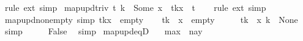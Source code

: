 \begin{isabellebody}
\ {\isacharparenleft}{\kern0pt}rule\ ext{\isacharparenright}{\kern0pt}\ simp%
\endisatagproof
{\isafoldproof}%
%
\isadelimproof
%
\endisadelimproof
%
\isadelimdocument
%
\endisadelimdocument
%
\isatagdocument
%
\isamarkuptrue%
%
\endisatagdocument
{\isafolddocument}%
%
\isadelimdocument
%
\endisadelimdocument
{}\isamarkupfalse%
\ map{\isacharunderscore}{\kern0pt}upd{\isacharunderscore}{\kern0pt}triv{\isacharcolon}{\kern0pt}\ {\isachardoublequoteopen}t\ k\ {\isacharequal}{\kern0pt}\ Some\ x\ {\isasymLongrightarrow}\ t{\isacharparenleft}{\kern0pt}k{\isasymmapsto}x{\isacharparenright}{\kern0pt}\ {\isacharequal}{\kern0pt}\ t{\isachardoublequoteclose}\isanewline
%
\isadelimproof
\ \ %
\endisadelimproof
%
\isatagproof
{}\isamarkupfalse%
\ {\isacharparenleft}{\kern0pt}rule\ ext{\isacharparenright}{\kern0pt}\ simp%
\endisatagproof
{\isafoldproof}%
%
\isadelimproof
\isanewline
%
\endisadelimproof
\isanewline
{}\isamarkupfalse%
\ map{\isacharunderscore}{\kern0pt}upd{\isacharunderscore}{\kern0pt}nonempty\ {\isacharbrackleft}{\kern0pt}simp{\isacharbrackright}{\kern0pt}{\isacharcolon}{\kern0pt}\ {\isachardoublequoteopen}t{\isacharparenleft}{\kern0pt}k{\isasymmapsto}x{\isacharparenright}{\kern0pt}\ {\isasymnoteq}\ empty{\isachardoublequoteclose}\isanewline
%
\isadelimproof
%
\endisadelimproof
%
\isatagproof
{}\isamarkupfalse%
\isanewline
\ \ \isamarkupfalse%
\ {\isachardoublequoteopen}t{\isacharparenleft}{\kern0pt}k\ {\isasymmapsto}\ x{\isacharparenright}{\kern0pt}\ {\isacharequal}{\kern0pt}\ empty{\isachardoublequoteclose}\isanewline
\ \ \isamarkupfalse%
\ \isamarkupfalse%
\ {\isachardoublequoteopen}{\isacharparenleft}{\kern0pt}t{\isacharparenleft}{\kern0pt}k\ {\isasymmapsto}\ x{\isacharparenright}{\kern0pt}{\isacharparenright}{\kern0pt}\ k\ {\isacharequal}{\kern0pt}\ None{\isachardoublequoteclose}\ \isamarkupfalse%
\ simp\isanewline
\ \ \isamarkupfalse%
\ \isamarkupfalse%
\ False\ \isamarkupfalse%
\ simp\isanewline
{}\isamarkupfalse%
%
\endisatagproof
{\isafoldproof}%
%
\isadelimproof
\isanewline
%
\endisadelimproof
\isanewline
{}\isamarkupfalse%
\ map{\isacharunderscore}{\kern0pt}upd{\isacharunderscore}{\kern0pt}eqD{}{\isacharcolon}{\kern0pt}\isanewline
\ \ \ {\isachardoublequoteopen}m{\isacharparenleft}{\kern0pt}a{\isasymmapsto}x{\isacharparenright}{\kern0pt}\ {\isacharequal}{\kern0pt}\ n{\isacharparenleft}{\kern0pt}a{\isasymmapsto}y{\isacharparenright}{\kern0pt}{\isachardoublequoteclose}\isanewline

\end{isabellebody}
